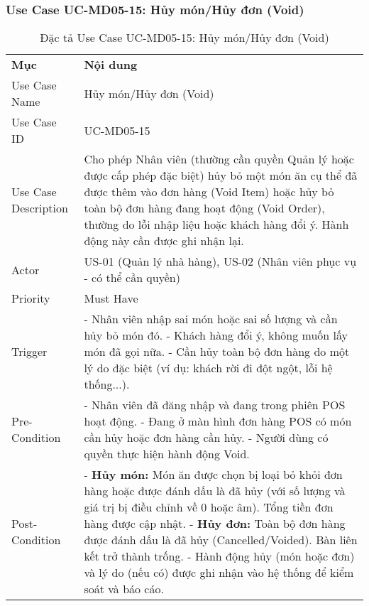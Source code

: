 \subsubsection{Use Case UC-MD05-15: Hủy món/Hủy đơn (Void)}

\begin{longtable}{|m{4cm}|p{11cm}|}
\caption{Đặc tả Use Case UC-MD05-15: Hủy món/Hủy đơn (Void)} \label{tab:uc_md05_15} \\
\hline

\endhead %
\hline
\endfoot %
\hline
\endlastfoot %
\multicolumn{2}{|c|}{\textbf{2.1. Tóm tắt (Summary)}} \\
\hline
\textbf{Mục} & \textbf{Nội dung} \\
\hline
Use Case Name & Hủy món/Hủy đơn (Void) \\
\hline
Use Case ID & UC-MD05-15 \\
\hline
Use Case Description & Cho phép Nhân viên (thường cần quyền Quản lý hoặc được cấp phép đặc biệt) hủy bỏ một món ăn cụ thể đã được thêm vào đơn hàng (Void Item) hoặc hủy bỏ toàn bộ đơn hàng đang hoạt động (Void Order), thường do lỗi nhập liệu hoặc khách hàng đổi ý. Hành động này cần được ghi nhận lại. \\
\hline
Actor & US-01 (Quản lý nhà hàng), US-02 (Nhân viên phục vụ - có thể cần quyền) \\
\hline
Priority & Must Have \\
\hline
Trigger & - Nhân viên nhập sai món hoặc sai số lượng và cần hủy bỏ món đó. \newline - Khách hàng đổi ý, không muốn lấy món đã gọi nữa. \newline - Cần hủy toàn bộ đơn hàng do một lý do đặc biệt (ví dụ: khách rời đi đột ngột, lỗi hệ thống...). \\
\hline
Pre-Condition & - Nhân viên đã đăng nhập và đang trong phiên POS hoạt động. \newline - Đang ở màn hình đơn hàng POS có món cần hủy hoặc đơn hàng cần hủy. \newline - Người dùng có quyền thực hiện hành động Void. \\
\hline
Post-Condition & - \textbf{Hủy món:} Món ăn được chọn bị loại bỏ khỏi đơn hàng hoặc được đánh dấu là đã hủy (với số lượng và giá trị bị điều chỉnh về 0 hoặc âm). Tổng tiền đơn hàng được cập nhật. \newline - \textbf{Hủy đơn:} Toàn bộ đơn hàng được đánh dấu là đã hủy (Cancelled/Voided). Bàn liên kết trở thành trống. \newline - Hành động hủy (món hoặc đơn) và lý do (nếu có) được ghi nhận vào hệ thống để kiểm soát và báo cáo. \\

\end{longtable}
